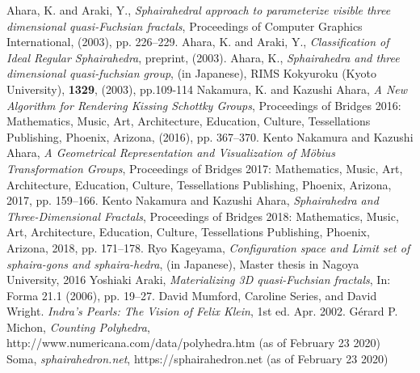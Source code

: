 \documentclass[suppldata, dvipdfmx]{interact}
\theoremstyle{plain}%
\theoremstyle{definition}
\theoremstyle{remark}
\theoremstyle{problemstyle}
\begin{document}
\begin{thebibliography}{99}
        Ahara, K. and Araki, Y.,
        \emph{Sphairahedral approach to parameterize visible three
        dimensional quasi-Fuchsian fractals},
        Proceedings of Computer Graphics International, (2003),
        pp. 226--229.
        Ahara, K. and Araki, Y.,
        \emph{Classification of Ideal Regular Sphairahedra},
        preprint, (2003).
        Ahara, K., \emph{Sphairahedra and three dimensional quasi-fuchsian group},
        (in Japanese), RIMS Kokyuroku (Kyoto University), {\bfseries 1329}, (2003), pp.109-114
        Nakamura, K. and Kazushi Ahara,
        \emph{A New Algorithm for Rendering Kissing Schottky Groups}, 
        Proceedings of Bridges 2016: Mathematics, Music, Art, Architecture,
        Education, Culture, Tessellations Publishing,
        Phoenix, Arizona, (2016), pp. 367--370.
        Kento Nakamura and Kazushi Ahara,
        \emph{A Geometrical Representation and Visualization of M\"{o}bius Transformation Groups}, 
        Proceedings of Bridges 2017: Mathematics, Music, Art, Architecture,
        Education, Culture, Tessellations Publishing,
        Phoenix, Arizona, 2017, pp. 159--166.
        Kento Nakamura and Kazushi Ahara,
        \emph{Sphairahedra and Three-Dimensional Fractals}, 
        Proceedings of Bridges 2018: Mathematics, Music, Art, Architecture,
        Education, Culture, Tessellations Publishing,
        Phoenix, Arizona, 2018, pp. 171--178.
        Ryo Kageyama,
        \emph{Configuration space and Limit set of sphaira-gons and sphaira-hedra},
        (in Japanese), Master thesis in Nagoya University, 2016
        Yoshiaki Araki,
        \emph{Materializing 3D quasi-Fuchsian fractals},
        In: Forma 21.1 (2006), pp. 19–27.
        David Mumford, Caroline Series, and David Wright.
        \emph{Indra’s Pearls: The Vision of Felix Klein},
        1st ed. Apr. 2002.
        G\'erard P. Michon, 
        \emph{Counting Polyhedra},\\
        http://www.numericana.com/data/polyhedra.htm
        (as of February 23 2020)
        Soma, 
        \emph{sphairahedron.net},
        https://sphairahedron.net
        (as of February 23 2020)

\end{thebibliography}
\end{document}
